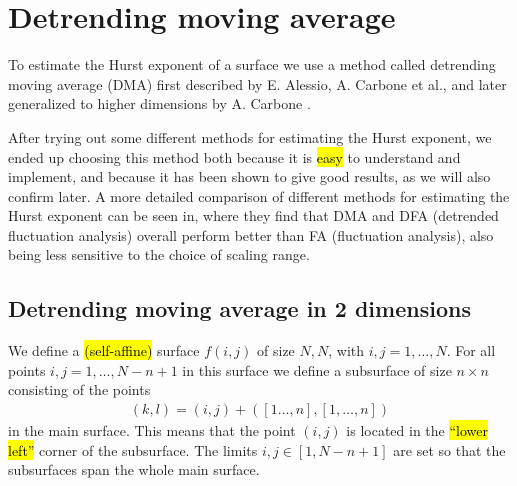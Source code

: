 \section{Detrending moving average}
To estimate the Hurst exponent of a surface we use a method called detrending moving average (DMA) first described by E. Alessio, A. Carbone et al.\cite{alessio2002dma}, and later generalized to higher dimensions by A. Carbone \cite{carbone2007algorithm}. 

After trying out some different methods for estimating the Hurst exponent, we ended up choosing this method both because it is \hl{easy} to understand and implement, and because it has been shown to give good results, as we will also confirm later. A more detailed comparison of different methods for estimating the Hurst exponent can be seen in\cite{shao2012comparing}, where they find that DMA and DFA (detrended fluctuation analysis) overall perform better than FA (fluctuation analysis), also being less sensitive to the choice of scaling range.


\subsection{Detrending moving average in 2 dimensions}

We define a \hl{(self-affine)} surface $f(i,j)$ of size $N,N$, with $i,j = 1,\dots,N$. For all points $i,j = 1,\dots,N-n+1$ in this surface we define a subsurface of size $n\times n$ consisting of the points
\begin{align*}
    (k,l) = (i,j) + \left([1\dots,n], [1,\dots,n]\right)%
\end{align*}
in the main surface. This means that the point $(i,j)$ is located in the \hl{``lower left''} corner of the subsurface. The limits $i,j \in [1,N-n+1]$ are set so that the subsurfaces span the whole main surface.

